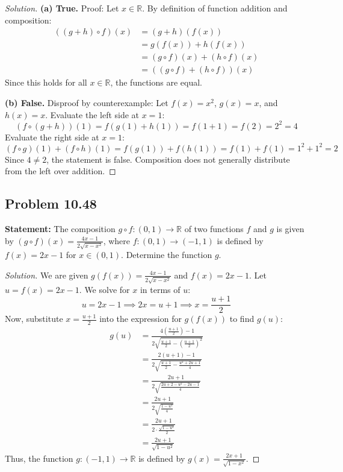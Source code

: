 \documentclass[11pt, a4paper]{article}
\theoremstyle{definition}
\theoremstyle{remark}
\newcommand{\R}{\mathbb{R}}
\begin{document}
\begin{proof}[Solution]
\textbf{(a) True.} Proof: Let $x \in \R$. By definition of function addition and composition:
\begin{align*}
    ((g + h) \circ f)(x) &= (g + h)(f(x)) \\
    &= g(f(x)) + h(f(x)) \\
    &= (g \circ f)(x) + (h \circ f)(x) \\
    &= ((g \circ f) + (h \circ f))(x)
\end{align*}
Since this holds for all $x \in \R$, the functions are equal.

\textbf{(b) False.} Disproof by counterexample: Let $f(x) = x^2$, $g(x) = x$, and $h(x) = x$.
Evaluate the left side at $x = 1$:
\[ (f \circ (g + h))(1) = f(g(1) + h(1)) = f(1 + 1) = f(2) = 2^2 = 4 \]
Evaluate the right side at $x = 1$:
\[ (f \circ g)(1) + (f \circ h)(1) = f(g(1)) + f(h(1)) = f(1) + f(1) = 1^2 + 1^2 = 2 \]
Since $4 \neq 2$, the statement is false. Composition does not generally distribute from the left over addition.
\end{proof}

\subsection*{Problem 10.48}
\textbf{Statement:} The composition $g \circ f: (0, 1) \to \R$ of two functions $f$ and $g$ is given by $(g \circ f)(x) = \frac{4x - 1}{2\sqrt{x - x^2}}$, where $f: (0, 1) \to (-1, 1)$ is defined by $f(x) = 2x - 1$ for $x \in (0, 1)$. Determine the function $g$.

\begin{proof}[Solution]
We are given $g(f(x)) = \frac{4x - 1}{2\sqrt{x - x^2}}$ and $f(x) = 2x - 1$.
Let $u = f(x) = 2x - 1$. We solve for $x$ in terms of $u$:
\[ u = 2x - 1 \implies 2x = u + 1 \implies x = \frac{u + 1}{2} \]
Now, substitute $x = \frac{u + 1}{2}$ into the expression for $g(f(x))$ to find $g(u)$:
\begin{align*}
    g(u) &= \frac{4\left(\frac{u + 1}{2}\right) - 1}{2\sqrt{\frac{u + 1}{2} - \left(\frac{u + 1}{2}\right)^2}} \\
    &= \frac{2(u + 1) - 1}{2\sqrt{\frac{u + 1}{2} - \frac{u^2 + 2u + 1}{4}}} \\
    &= \frac{2u + 1}{2\sqrt{\frac{2u + 2 - u^2 - 2u - 1}{4}}} \\
    &= \frac{2u + 1}{2\sqrt{\frac{1 - u^2}{4}}} \\
    &= \frac{2u + 1}{2 \cdot \frac{\sqrt{1 - u^2}}{2}} \\
    &= \frac{2u + 1}{\sqrt{1 - u^2}}
\end{align*}
Thus, the function $g: (-1, 1) \to \R$ is defined by $g(x) = \frac{2x + 1}{\sqrt{1 - x^2}}$.
\end{proof}
\end{document}
